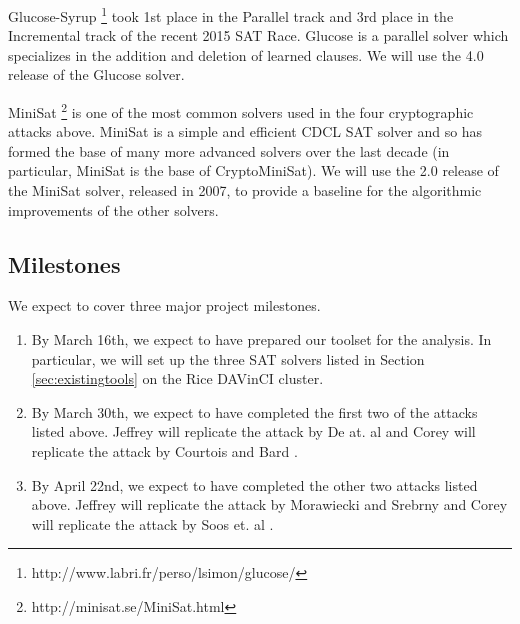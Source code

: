 Glucose-Syrup \footnote{http://www.labri.fr/perso/lsimon/glucose/} took 1st place in the Parallel track and 3rd place in the Incremental track of the recent 2015 SAT Race. Glucose is a parallel solver which specializes in the addition and deletion of learned clauses. We will use the 4.0 release of the Glucose solver.

MiniSat \footnote{http://minisat.se/MiniSat.html} is one of the most common solvers used in the four cryptographic attacks above. MiniSat is a simple and efficient CDCL SAT solver and so has formed the base of many more advanced solvers over the last decade (in particular, MiniSat is the base of CryptoMiniSat). We will use the 2.0 release of the MiniSat solver, released in 2007, to provide a baseline for the algorithmic improvements of the other solvers.

\subsection{Milestones}
We expect to cover three major project milestones.
\begin{enumerate}
	\item By March 16th, we expect to have prepared our toolset for the analysis. In particular, we will set up the three SAT solvers listed in Section \ref{sec:existingtools} on the Rice DAVinCI cluster.
	
	\item By March 30th, we expect to have completed the first two of the attacks listed above. Jeffrey will replicate the attack by De at. al \cite{DKV07} and Corey will replicate the attack by Courtois and Bard \cite{CB07}.
	
	\item By April 22nd, we expect to have completed the other two attacks listed above. Jeffrey will replicate the attack by Morawiecki and Srebrny \cite{MS13} and Corey will replicate the attack by Soos et. al \cite{SNC09}.
\end{enumerate}